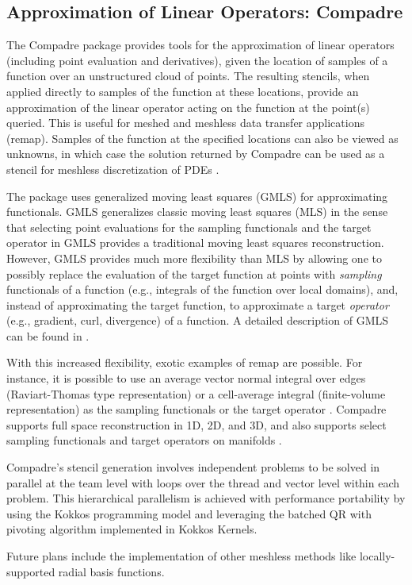 \subsection{Approximation of Linear Operators: Compadre}

The Compadre package provides tools for the approximation of linear operators (including point evaluation and derivatives), given the location of samples of a function over an unstructured cloud of points. The resulting stencils, when applied directly to samples of the function at these locations, provide an approximation of the linear operator acting on the function at the point(s) queried. This is useful for meshed and meshless data transfer applications (remap). Samples of the function at the specified locations can also be viewed as unknowns, in which case the solution returned by Compadre can be used as a stencil for meshless discretization of PDEs \cite{REBAR2024}.

The package uses generalized moving least squares (GMLS) for approximating functionals. GMLS generalizes classic moving least squares (MLS) in the sense that selecting point evaluations for the sampling functionals and the target operator in GMLS provides a traditional moving least squares reconstruction. However, GMLS provides much more flexibility than MLS by allowing one to possibly replace the evaluation of the target function at points with \emph{sampling} functionals of a function (e.g., integrals of the function over local domains),  and, instead of approximating the target function, to approximate a target \emph{operator} (e.g., gradient, curl, divergence) of a function. A detailed description of GMLS can be found in \cite{mirzaei2012generalized,wendland2004scattered}.

With this increased flexibility, exotic examples of remap are possible. For instance, it is possible to use an average vector normal integral over edges (Raviart-Thomas type representation) or a cell-average integral (finite-volume representation) as the sampling functionals or the target operator \cite{gmd-15-6601-2022}. Compadre supports full space reconstruction in 1D, 2D, and 3D, and also supports select sampling functionals and target operators on manifolds \cite{GROSS2020109340}.

Compadre's stencil generation involves independent problems to be solved in parallel at the team level with loops over the thread and vector level within each problem. This hierarchical parallelism is achieved with performance portability by using the Kokkos programming model and leveraging the batched QR with pivoting algorithm implemented in Kokkos Kernels.

Future plans include the implementation of other meshless methods like locally-supported radial basis functions.


